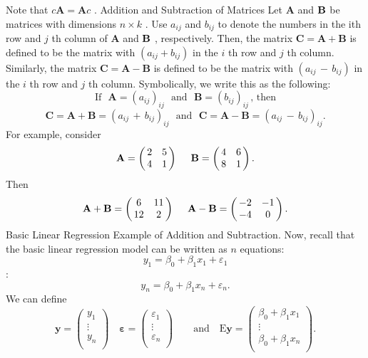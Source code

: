 \documentclass[11pt]{article}
\begin{document}
 Note that \(c \mathbf{A}=\mathbf{A} c\) .
 Addition and Subtraction of Matrices
Let \(\mathbf{A}\) and \({\bf B}\) be matrices with dimensions \(n \times k\) . Use \(a_{i j}\) and \(b_{i j}\) to denote the
numbers in the ith row and \(j\) th column of \(\mathbf{A}\) and \({\bf B}\) , respectively. Then, the
matrix \(\mathbf{C}=\mathbf{A}+\mathbf{B}\) is defined to be the matrix with \(( a_{i j}+b_{i j} )\) in the \(i\) th row and
\(j\) th column. Similarly, the matrix \(\mathbf{C}=\mathbf{A}-\mathbf{B}\) is defined to be the matrix with
\(( a_{i j} \,-\, b_{i j} )\) in the \(i\) th row and \(j\) th column. Symbolically, we write this as the
following:
\[
\mathrm{I f} \ \ \ \mathbf{A}=\left( a_{i j} \right)_{i j} \ \ \ \mathrm{a n d} \ \ \ \mathbf{B}=\left( b_{i j} \right)_{i j} \, , \, \mathrm{t h e n}
\]
\[
\mathbf{C}=\mathbf{A}+\mathbf{B}=\left( a_{i j} \,+\, b_{i j} \right)_{i j} \ \ \mathrm{~ a n d ~} \ \ \mathbf{C}=\mathbf{A}-\mathbf{B}=\left( a_{i j} \,-\, b_{i j} \right)_{i j} .
\]
For example, consider
\[
\mathbf{A}=\left( \! \! \begin{array} {c c} {2} & {5} \\ {4} & {1} \\ \end{array} \! \! \right) \ \ \ \ \mathbf{B}=\left( \! \! \begin{array} {c c} {4} & {6} \\ {8} & {1} \\ \end{array} \! \! \right) .
\]
Then
\[
\mathbf{A}+\mathbf{B}=\left( \! \! \begin{array} {c c} {6} & {1 1} \\ {1 2} & {2} \\ \end{array} \! \! \right) \ \ \ \ \mathbf{A}-\mathbf{B}=\left( \! \! \begin{array} {c c} {-2} & {-1} \\ {-4} & {0} \\ \end{array} \! \! \right) .
\]
Basic Linear Regression Example of Addition and Subtraction. Now, recall
 that the basic linear regression model can be written as \(n\) equations:
\[
y_{1}=\beta_{0}+\beta_{1} x_{1}+\varepsilon_{1}
\]
:
\[
y_{n}=\beta_{0}+\beta_{1} x_{n}+\varepsilon_{n} .
\]
We can define
\[
\mathbf{y}=\left( \begin{matrix} {y_{1}} \\ {\vdots} \\ {y_{n}} \\ \end{matrix} \right) \quad\boldsymbol{\varepsilon}=\left( \begin{matrix} {\varepsilon_{1}} \\ {\vdots} \\ {\varepsilon_{n}} \\ \end{matrix} \right) \quad\quad\mathrm{a n d} \quad\textrm{E} \mathbf{y}=\left( \begin{matrix} {\beta_{0}+\beta_{1} x_{1}} \\ {\vdots} \\ {\beta_{0}+\beta_{1} x_{n}} \\ \end{matrix} \right) .
\]
\end{document}
